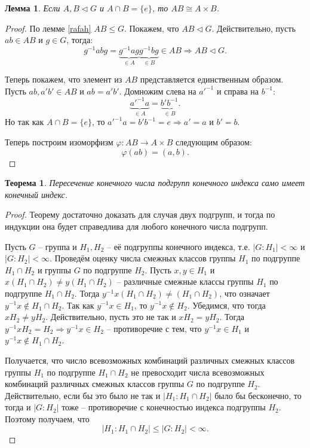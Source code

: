 \documentclass{article}
\newtheorem{lemma}{Лемма}[section]
\newtheorem{theorem}{Теорема}[section]
\begin{document}
\begin{lemma} \label{eritrea}
    Если $A, B \triangleleft G$ и $A \cap B = \{ e \}$, то $AB \cong A \times B$.
\end{lemma}
\begin{proof}
    По лемме \ref{rafah} $AB \leqslant G$. Покажем, что $AB \triangleleft G$. Действительно, пусть $ab \in AB$ и $g \in G$, тогда:
    \[
        g^{-1} ab g = \underbrace{g^{-1} a g}_{\in A} \underbrace{g^{-1} b g}_{\in B} \in AB \Rightarrow AB \triangleleft G.
    \]

    Теперь покажем, что элемент из $AB$ представляется единственным образом. Пусть $ab, a'b' \in AB$ и $ab = a'b'$. Домножим слева на $a'^{-1}$ и справа на $b^{-1}$: $$ \underbrace{a'^{-1} a}_{\in A} = \underbrace{b' b^{-1}}_{\in B}. $$ Но так как $A \cap B = \{ e \}$, то $a'^{-1} a = b' b^{-1} = e \Rightarrow a' = a$ и $b' = b$.

    Теперь построим изоморфизм $\varphi: AB \rightarrow A \times B$ следующим образом: $$ \varphi(ab) = (a, b). $$
\end{proof}

\begin{theorem} \label{fhsuopi}
    Пересечение конечного числа подгрупп конечного индекса само имеет конечный индекс.
\end{theorem}
\begin{proof}
    Теорему достаточно доказать для случая двух подгрупп, и тогда по индукции она будет справедлива для любого конечного числа подгрупп.

    Пусть $G$ -- группа и $H_1, H_2$ -- её подгруппы конечного индекса, т.е. $|G: H_1| < \infty$ и $|G: H_2| < \infty$.
    Проведём оценку числа смежных классов группы $H_1$ по подгруппе $H_1 \cap H_2$ и группы $G$ по подгруппе $H_2$. Пусть $x, y \in H_1$ и $x(H_1 \cap H_2) \neq y(H_1 \cap H_2)$ -- различные смежные классы группы $H_1$ по подгруппе $H_1 \cap H_2$.
    Тогда $y^{-1} x (H_1 \cap H_2) \neq (H_1 \cap H_2)$, что означает $y^{-1} x \notin H_1 \cap H_2$. Так как $y^{-1} x \in H_1$, то $y^{-1} x \notin H_2$.
    Убедимся, что тогда $xH_2 \neq y H_2$. Действительно, пусть это не так и $x H_2 = y H_2$. Тогда $ y^{-1} x H_2 = H_2 \Rightarrow y^{-1} x \in H_2$ -- противоречие с тем, что $y^{-1} x \in H_1$ и $y^{-1} x \notin H_1 \cap H_2$.
    
    Получается, что число всевозможных комбинаций различных смежных классов группы $H_1$ по подгруппе $H_1 \cap H_2$ не превосходит числа всевозможных комбинаций различных смежных классов группы $G$ по подгруппе $H_2$. Действительно, если бы это было не так и $|H_1:H_1 \cap H_2|$ было бы бесконечно, то тогда и $|G:H_2|$ тоже -- противоречие с конечностью индекса подгруппы $H_2$. Поэтому получаем, что $$ |H_1:H_1 \cap H_2| \leqslant |G:H_2| < \infty. $$
\end{proof}
\end{document}
